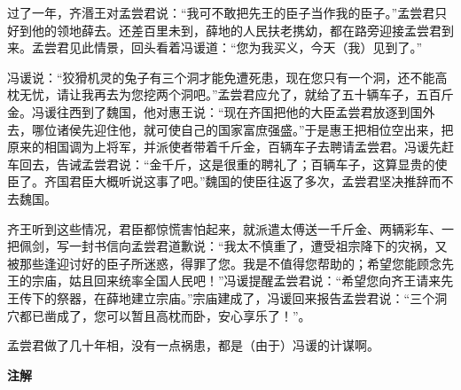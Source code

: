 \documentclass[12pt,UTF-8,openany,a4]{ctexbook}
\begin{document}
\begin{large}
    过了一年，齐湣王对孟尝君说：“我可不敢把先王的臣子当作我的臣子。”孟尝君只好到他的领地薛去。还差百里未到，薛地的人民扶老携幼，都在路旁迎接孟尝君到来。孟尝君见此情景，回头看着冯谖道：“您为我买义，今天（我）见到了。”
    
    冯谖说：“狡猾机灵的兔子有三个洞才能免遭死患，现在您只有一个洞，还不能高枕无忧，请让我再去为您挖两个洞吧。”孟尝君应允了，就给了五十辆车子，五百斤金。冯谖往西到了魏国，他对惠王说：“现在齐国把他的大臣孟尝君放逐到国外去，哪位诸侯先迎住他，就可使自己的国家富庶强盛。”于是惠王把相位空出来，把原来的相国调为上将军，并派使者带着千斤金，百辆车子去聘请孟尝君。冯谖先赶车回去，告诫孟尝君说：“金千斤，这是很重的聘礼了；百辆车子，这算显贵的使臣了。齐国君臣大概听说这事了吧。”魏国的使臣往返了多次，孟尝君坚决推辞而不去魏国。
    
    齐王听到这些情况，君臣都惊慌害怕起来，就派遣太傅送一千斤金、两辆彩车、一把佩剑，写一封书信向孟尝君道歉说：“我太不慎重了，遭受祖宗降下的灾祸，又被那些逢迎讨好的臣子所迷惑，得罪了您。我是不值得您帮助的；希望您能顾念先王的宗庙，姑且回来统率全国人民吧！”冯谖提醒孟尝君说：“希望您向齐王请来先王传下的祭器，在薛地建立宗庙。”宗庙建成了，冯谖回来报告孟尝君说：“三个洞穴都已凿成了，您可以暂且高枕而卧，安心享乐了！”。
    
    孟尝君做了几十年相，没有一点祸患，都是（由于）冯谖的计谋啊。
    
\end{large}


\newpage

\begin{Large}
    \noindent\textbf{注解}
\end{Large}


\vspace{-1em}
\end{document}
